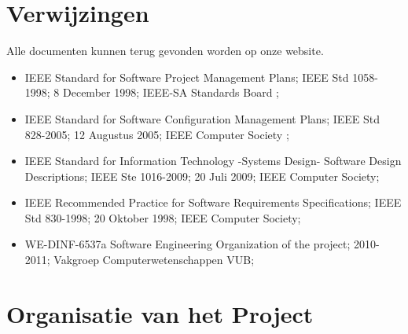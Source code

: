 \documentclass{article}
\begin{document}
\section{Verwijzingen}



Alle documenten kunnen terug gevonden worden op onze website.

\begin{itemize}
	\item IEEE Standard for Software Project Management Plans; IEEE Std 1058-1998; 8 December 1998; IEEE-SA Standards Board ; \\ 
	\item IEEE Standard for Software Configuration Management Plans; IEEE Std 828-2005; 12 Augustus 2005; IEEE Computer Society ; \\
	\item IEEE Standard for Information Technology -Systems Design- Software Design Descriptions; IEEE Ste 1016-2009; 20 Juli 2009; IEEE Computer Society;  \\
	\item IEEE Recommended Practice for Software Requirements Specifications; IEEE Std 830-1998; 20 Oktober 1998; IEEE Computer Society; \\
	\item WE-DINF-6537a  Software Engineering Organization of the project; 2010-2011; Vakgroep Computerwetenschappen VUB;  \\
\end{itemize}


\newpage
\section{Organisatie van het Project}

\end{document}
